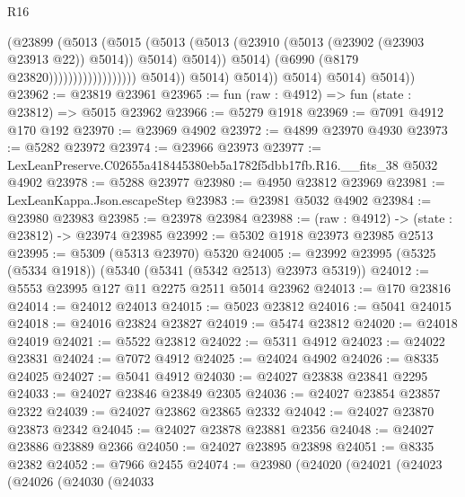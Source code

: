 \begin{lexlean}{R16}
\begin{coremodule}
                                                    (@23899
                                                      (@5013
                                                        (@5015
                                                          (@5013
                                                            (@5013
                                                              (@23910
                                                                (@5013
                                                                  (@23902 (@23903 @23913 @22))
                                                                  @5014))
                                                              @5014)
                                                            @5014))
                                                        @5014)
                                                      (@6990 (@8179 @23820))))))))))))))))))
                      @5014))
                  @5014)
                @5014))
            @5014)
          @5014)
        @5014))
@23962 := @23819 @23961
@23965 := fun (raw : @4912) => fun (state : @23812) => @5015 @23962
@23966 := @5279 @1918
@23969 := @7091 @4912 @170 @192
@23970 := @23969 @4902
@23972 := @4899 @23970 @4930
@23973 := @5282 @23972
@23974 := @23966 @23973
@23977 := LexLeanPreserve.C02655a418445380eb5a1782f5dbb17fb.R16.__fits_38 @5032 @4902
@23978 := @5288 @23977
@23980 := @4950 @23812 @23969
@23981 := LexLeanKappa.Json.escapeStep
@23983 := @23981 @5032 @4902
@23984 := @23980 @23983
@23985 := @23978 @23984
@23988 := (raw : @4912) -> (state : @23812) -> @23974 @23985
@23992 := @5302 @1918 @23973 @23985 @2513
@23995 := @5309 (@5313 @23970) @5320
@24005 := @23992 @23995 (@5325 (@5334 @1918)) (@5340 (@5341 (@5342 @2513) @23973 @5319))
@24012 := @5553 @23995 @127 @11 @2275 @2511 @5014 @23962
@24013 := @170 @23816
@24014 := @24012 @24013
@24015 := @5023 @23812
@24016 := @5041 @24015
@24018 := @24016 @23824 @23827
@24019 := @5474 @23812
@24020 := @24018 @24019
@24021 := @5522 @23812
@24022 := @5311 @4912
@24023 := @24022 @23831
@24024 := @7072 @4912
@24025 := @24024 @4902
@24026 := @8335 @24025
@24027 := @5041 @4912
@24030 := @24027 @23838 @23841 @2295
@24033 := @24027 @23846 @23849 @2305
@24036 := @24027 @23854 @23857 @2322
@24039 := @24027 @23862 @23865 @2332
@24042 := @24027 @23870 @23873 @2342
@24045 := @24027 @23878 @23881 @2356
@24048 := @24027 @23886 @23889 @2366
@24050 := @24027 @23895 @23898
@24051 := @8335 @2382
@24052 := @7966 @2455
@24074 := @23980
    (@24020
      (@24021
        (@24023
          (@24026
            (@24030
              (@24033

\end{coremodule}
\end{lexlean}
